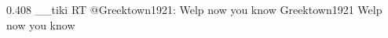 %
%
%

{0.408}
{\joinNameTweet
{\_\_tiki}
{RT @Greektown1921: Welp now you know}}
{\joinNameTweet
{Greektown1921}
{Welp now you know}}
%
%
%
%
%
%
%
%

